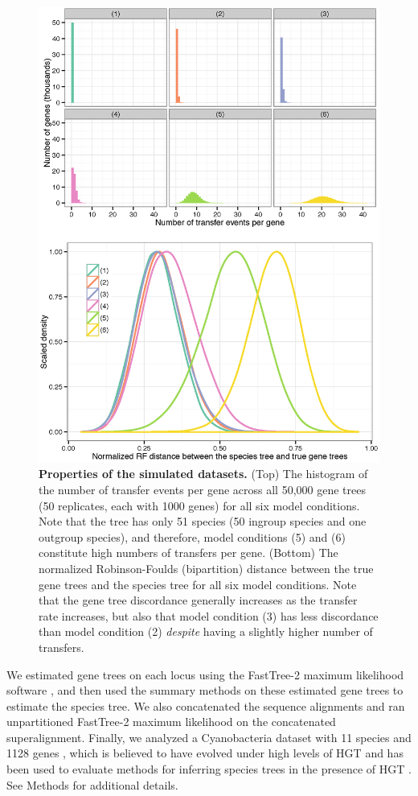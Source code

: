   \begin{figure}
\centering
\includegraphics[width=12cm]{hgt-figs/both.eps}
 \caption[Properties of simulated datasets for HGT+ILS study]{{\bf Properties of the simulated datasets.  } 
(Top) The histogram of the number of transfer events per gene across all 50,000 gene trees (50 replicates, each with 1000 genes) for all six model conditions. Note that the tree has only 51 species (50
ingroup species and one outgroup species), and therefore, model conditions (5) and (6) constitute high numbers of transfers per gene. 
(Bottom) The normalized Robinson-Foulds (bipartition)  distance 
between the true gene trees and the species tree for all six model conditions. Note that the gene tree discordance generally increases as the transfer rate increases, but also that model condition (3) has less discordance than model condition (2) {\em despite} having a slightly higher number of transfers. }
\label{hgt::sim}
      \end{figure}


We estimated gene trees on each
locus using the FastTree-2  maximum likelihood software \cite{FastTree2}, 
and then used the 
summary methods on these 
estimated gene trees to estimate the species tree.
We also concatenated the sequence alignments and ran unpartitioned
FastTree-2
maximum likelihood 
on the concatenated superalignment. 
Finally, 
we analyzed a
Cyanobacteria dataset with 11 species and 1128 genes \cite{Cyanobacteria}, which
is believed to have evolved under high levels of HGT and 
has been used to evaluate  methods for inferring species trees in 
the presence of HGT \cite{BansalHGTProkaryotes,wQMC}. 
See Methods for additional details.

